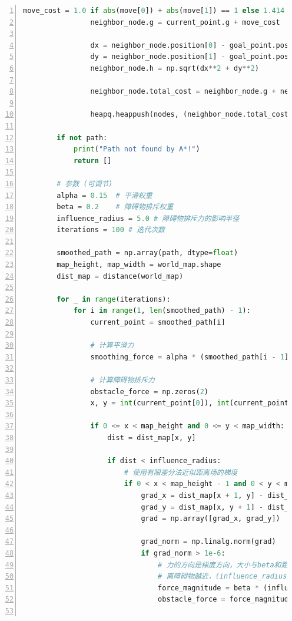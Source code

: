 \documentclass[aps,letterpaper,10pt]{revtex4}
\begin{document}
\begin{lstlisting}[language=Python, caption={Source Code for Task 1 (5-Task\_1.py)}, label={lst:task1_code}, basicstyle=\ttfamily\small, numbers=left, frame=tb, breaklines=true]
                move_cost = 1.0 if abs(move[0]) + abs(move[1]) == 1 else 1.414
                neighbor_node.g = current_point.g + move_cost
    
                dx = neighbor_node.position[0] - goal_point.position[0]
                dy = neighbor_node.position[1] - goal_point.position[1]
                neighbor_node.h = np.sqrt(dx**2 + dy**2)
    
                neighbor_node.total_cost = neighbor_node.g + neighbor_node.h
    
                heapq.heappush(nodes, (neighbor_node.total_cost, neighbor_node))
    
        if not path:
            print("Path not found by A*!")
            return []
    
        # 参数 (可调节)
        alpha = 0.15  # 平滑权重
        beta = 0.2    # 障碍物排斥权重
        influence_radius = 5.0 # 障碍物排斥力的影响半径
        iterations = 100 # 迭代次数
    
        smoothed_path = np.array(path, dtype=float)
        map_height, map_width = world_map.shape
        dist_map = distance(world_map)
    
        for _ in range(iterations):
            for i in range(1, len(smoothed_path) - 1):
                current_point = smoothed_path[i]
    
                # 计算平滑力
                smoothing_force = alpha * (smoothed_path[i - 1] + smoothed_path[i + 1] - 2 * current_point)
    
                # 计算障碍物排斥力
                obstacle_force = np.zeros(2)
                x, y = int(current_point[0]), int(current_point[1])
                
                if 0 <= x < map_height and 0 <= y < map_width:
                    dist = dist_map[x, y]
                    
                    if dist < influence_radius:
                        # 使用有限差分法近似距离场的梯度
                        if 0 < x < map_height - 1 and 0 < y < map_width - 1:
                            grad_x = dist_map[x + 1, y] - dist_map[x - 1, y]
                            grad_y = dist_map[x, y + 1] - dist_map[x, y - 1]
                            grad = np.array([grad_x, grad_y])
                            
                            grad_norm = np.linalg.norm(grad)
                            if grad_norm > 1e-6:
                                # 力的方向是梯度方向，大小与beta和距离成反比
                                # 离障碍物越近，(influence_radius - dist)越大，力也越大
                                force_magnitude = beta * (influence_radius - dist) / influence_radius
                                obstacle_force = force_magnitude * (grad / grad_norm)
                

\end{lstlisting}
\end{document}
